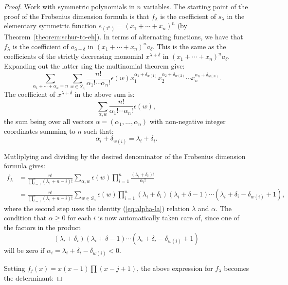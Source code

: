 \documentclass[11pt]{amsart}
\theoremstyle{definition}
\theoremstyle{example}
\begin{document}
\begin{proof}
  Work with symmetric polynomials in $n$ variables.
  The starting point of the proof of the Frobenius dimension formula is that $f_\lambda$ is the coefficient of $s_\lambda$ in the elementary symmetric function $e_{(1^n)} = (x_1+\dotsb+x_n)^n$ (by Theorem~\ref{theorem:schur-to-eh}).
  In terms of alternating functions, we have that $f_\lambda$ is the coefficient of $a_{\lambda+\delta}$ in $(x_1+\dotsb+x_n)^na_\delta$.
  This is the same as the coefficients of the strictly decreasing monomial $x^{\lambda+\delta}$ in $(x_1+\dotsb+x_n)^na_\delta$.
  Expanding out the latter sing the multinomial theorem give:
  \begin{displaymath}
    \sum_{\alpha_1+\dotsb+\alpha_n=n} \sum_{w\in S_n} \frac{n!}{\alpha_1!\dotsb \alpha_n!} \epsilon(w) x_1^{\alpha_1+\delta_{w(1)}} x_2^{\alpha_2+\delta_{w(2)}} \dotsb x_n^{\alpha_n+\delta_{w(n)}}.
  \end{displaymath}
  The coefficient of $x^{\lambda+\delta}$ in the above sum is:
  \begin{displaymath}
    \sum_{\alpha, w} \frac{n!}{\alpha_1!\dotsb \alpha_n!}\epsilon(w),
  \end{displaymath}
  the sum being over all vectors $\alpha=(\alpha_1,\dotsc,\alpha_n)$ with non-negative integer coordinates summing to $n$ such that:
  \begin{equation}
    \label{eq:alpha-la}
    \alpha_i + \delta_{w(i)} = \lambda_i + \delta_i.
  \end{equation}
  
  Mutliplying and dividing by the desired denominator of the Frobenius dimension formula gives:
  \begin{align*}
    f_\lambda & = \frac{n!}{\prod_{i=1}^n(\lambda_1 + n - i)!}\sum_{\alpha,w} \epsilon(w) \prod_{i=1}^n \frac{(\lambda_i + \delta_i)!}{\alpha_i!}\\
    & = \frac{n!}{\prod_{i=1}^n(\lambda_1 + n - i)!}\sum_{w\in S_n} \epsilon(w)\prod_{i=1}^n (\lambda_i+\delta_i)(\lambda_i+\delta-1)\dotsb (\lambda_i+\delta_i-\delta_{w(i)} + 1),
  \end{align*}
  where the second step uses the identity (\ref{eq:alpha-la}) relation $\lambda$ and $\alpha$.
  The condition that $\alpha\geq 0$ for each $i$ is now automatically taken care of, since one of the factors in the product
  \begin{displaymath}
    (\lambda_i+\delta_i)(\lambda_i+\delta-1)\dotsb (\lambda_i+\delta_i-\delta_{w(i)} + 1)
  \end{displaymath}
  will be zero if $\alpha_i=\lambda_i+\delta_i-\delta_{w(i)}<0$.

  Setting $f_j(x) = x(x-1)\prod (x-j+1)$, the above expression for $f_\lambda$ becomes the determinant:

\end{proof}
\end{document}
